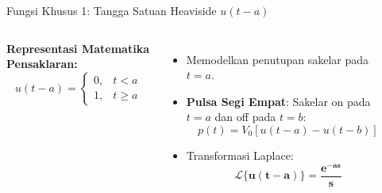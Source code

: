 \documentclass[aspectratio=169,10pt]{beamer}
\begin{document}
\begin{frame}{Fungsi Khusus 1: Tangga Satuan Heaviside $u(t - a)$}
  \begin{columns}[c]
    \textbf{Representasi Matematika Pensaklaran:}
    \begin{equation}
      u(t - a) = \begin{cases} 0, & t < a \\ 1, & t \ge a \end{cases}
    \end{equation}
    \begin{itemize}
      \item Memodelkan penutupan sakelar pada $t = a$.
      \item \textbf{Pulsa Segi Empat}: Sakelar on pada $t=a$ dan off pada $t=b$:
      \begin{equation*}
        p(t) = V_0 [u(t - a) - u(t - b)]
      \end{equation*}
      \item Transformasi Laplace:
      \begin{equation*}
        \mathbf{\mathcal{L}\{u(t - a)\} = \frac{e^{-as}}{s}}
      \end{equation*}
    \end{itemize}

    \begin{center}
    \end{center}
  \end{columns}
\end{frame}
\end{document}
